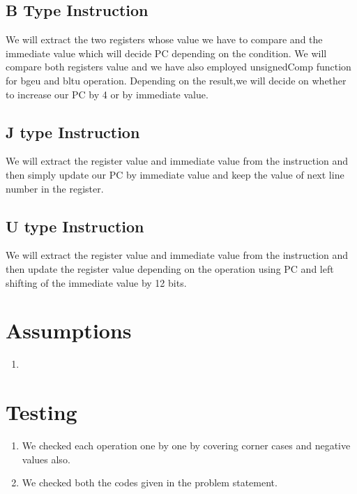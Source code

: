 \documentclass{article}
\begin{document}
	\subsection{B Type Instruction}
	We will extract the two registers whose value we have to compare and the immediate value which will decide PC depending on the condition. We will compare both registers value and we have also employed unsignedComp function for bgeu and bltu operation. Depending on the result,we will decide on whether to increase our PC by 4 or by immediate value.
	\subsection{J type Instruction}
	We will extract the register value and immediate value from the instruction and then simply update our PC by immediate value and keep the value of next line number in the register.
	\subsection{U type Instruction}
	We will extract the register value and immediate value from the instruction and then update the register value depending on the operation using PC and left shifting of the immediate value by 12 bits. 

	\section{Assumptions}
	\begin{enumerate}
		\item 
	\end{enumerate}

	\section{Testing}
	\begin{enumerate}
		\item We checked each operation one by one by covering corner cases and negative values also.
		\item We checked both the codes given in the problem statement.
	\end{enumerate}
	
\end{document}
